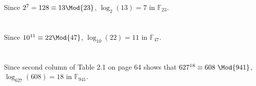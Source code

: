 \documentclass[
  coursecode={MTHE 418},
  assignmentname={Homework \homeworknumber},
  studentnumber=20053722,
  name={Bryan Hoang},
  draft,
  final,
]{
  ltxanswer%
}
\begin{document}
  \begin{questions}
    \setcounter{question}{\questionnumber}
    \addtocounter{question}{-1}
    \question[10]\
    \begin{parts}
      \part{}
      \begin{solution}
        Since \(2^{7} = 128 \equiv 13 \Mod{23}\), \(\log_{2}(13)=\boxed{7}\) in \(\mathbb{F}_{23}\).
      \end{solution}

      \part{}
      \begin{solution}
        Since \(10^{11} \equiv 22 \Mod{47}\), \(\log_{10}(22)=\boxed{11}\) in \(\mathbb{F}_{47}\).
      \end{solution}

      \part{}
      \begin{solution}
        Since second column of Table 2.1 on page 64 shows that \(627^{18} \equiv 608\ \Mod{941}\), \(\log_{627}(608)=\boxed{18}\) in \(\mathbb{F}_{941}\).
      \end{solution}
    \end{parts}
  \end{questions}
\end{document}

